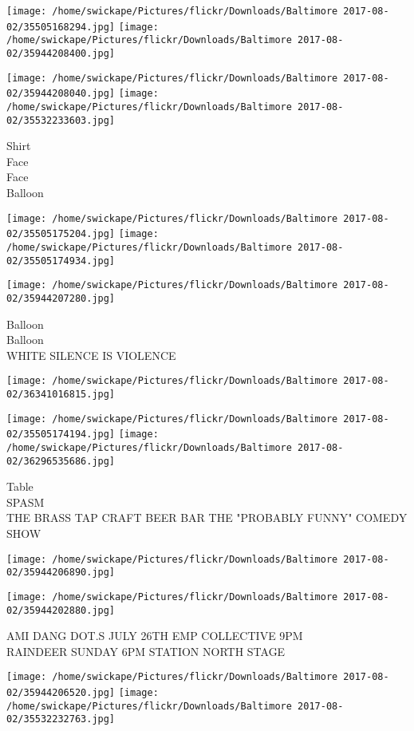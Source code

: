 \documentclass[10pt,letterpaper]{article}
\begin{document}
\texttt{[image: /home/swickape/Pictures/flickr/Downloads/Baltimore 2017-08-02/35505168294.jpg]}
\texttt{[image: /home/swickape/Pictures/flickr/Downloads/Baltimore 2017-08-02/35944208400.jpg]}

\texttt{[image: /home/swickape/Pictures/flickr/Downloads/Baltimore 2017-08-02/35944208040.jpg]}
\texttt{[image: /home/swickape/Pictures/flickr/Downloads/Baltimore 2017-08-02/35532233603.jpg]}

Shirt\\
Face\\
Face\\
Balloon
\pagebreak

\texttt{[image: /home/swickape/Pictures/flickr/Downloads/Baltimore 2017-08-02/35505175204.jpg]}
\texttt{[image: /home/swickape/Pictures/flickr/Downloads/Baltimore 2017-08-02/35505174934.jpg]}

\texttt{[image: /home/swickape/Pictures/flickr/Downloads/Baltimore 2017-08-02/35944207280.jpg]}

Balloon\\
Balloon\\
WHITE SILENCE IS VIOLENCE
\pagebreak

\texttt{[image: /home/swickape/Pictures/flickr/Downloads/Baltimore 2017-08-02/36341016815.jpg]}

\vspace{0.25in}
\texttt{[image: /home/swickape/Pictures/flickr/Downloads/Baltimore 2017-08-02/35505174194.jpg]}
\texttt{[image: /home/swickape/Pictures/flickr/Downloads/Baltimore 2017-08-02/36296535686.jpg]}

Table\\
SPASM\\
THE BRASS TAP CRAFT BEER BAR THE "PROBABLY FUNNY" COMEDY SHOW
\pagebreak

\texttt{[image: /home/swickape/Pictures/flickr/Downloads/Baltimore 2017-08-02/35944206890.jpg]}

\vspace{0.25in}
\texttt{[image: /home/swickape/Pictures/flickr/Downloads/Baltimore 2017-08-02/35944202880.jpg]}

AMI DANG DOT.S JULY 26TH EMP COLLECTIVE 9PM\\
RAINDEER SUNDAY 6PM STATION NORTH STAGE
\pagebreak

\texttt{[image: /home/swickape/Pictures/flickr/Downloads/Baltimore 2017-08-02/35944206520.jpg]}
\texttt{[image: /home/swickape/Pictures/flickr/Downloads/Baltimore 2017-08-02/35532232763.jpg]}
\end{document}
